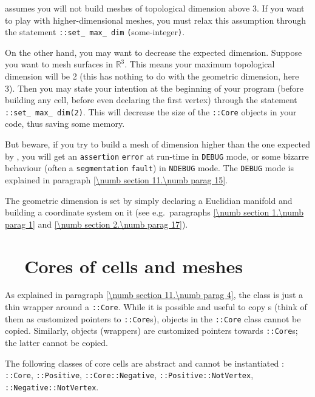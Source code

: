 \leavevmode {\ManiFEM} assumes you will not build meshes of topological dimension
above 3.
If you want to play with higher-dimensional meshes, you must relax this assumption
through the statement {\small\tt{}::set\_\,max\_\,dim}
{\small\tt (}some-integer{\small\tt )}.

On the other hand, you may want to decrease the expected dimension.
Suppose you want to mesh surfaces in $ \mathbb{R}^3 $.
This means your maximum topological dimension will be 2
(this has nothing to do with the geometric dimension, here 3).
Then you may state your intention at the beginning of your program
(before building any cell, before even declaring the first vertex) through
the statement {\small\tt{}::set\_\,max\_\,dim(2)}.
This will decrease the size of the {\small\tt{}::Core} objects in your code,
thus saving some memory.

But beware, if you try to build a mesh of dimension higher than the one expected by
\maniFEM, you will get an {\small\tt assertion} {\small\tt error} at run-time in
{\small\tt DEBUG} mode, or some bizarre behaviour (often a {\small\tt segmentation}
{\small\tt fault}) in {\small\tt NDEBUG} mode.
The {\small\tt DEBUG} mode is explained in paragraph \ref{\numb section 11.\numb parag 15}.

The geometric dimension is set by simply declaring a Euclidian manifold and building
a coordinate system on it (see e.g.\ paragraphs \ref{\numb section 1.\numb parag 1}
and \ref{\numb section 2.\numb parag 17}).


\section{~~Cores of cells and meshes}\label{\numb section 11.\numb parag 8}

As explained in paragraph \ref{\numb section 11.\numb parag 4}, the {\small\tt{}}
class is just a thin wrapper around a {\small\tt{}::Core}.
While it is possible and useful to copy {\small\tt{}}s (think of them as customized
pointers to {\small\tt{}::Core}s), objects in the {\small\tt{}::Core}
class cannot be copied.
Similarly, {\small\tt{}} objects (wrappers) are customized pointers towards
{\small\tt{}::Core}s; the latter cannot be copied.

The following classes of core cells are abstract and cannot be instantiated :
{\small\tt{}::Core}, {\small\tt{}::Positive},
{\small\tt{}::Core::Negative}, {\small\tt{}::Positive::NotVertex},
{\small\tt{}::Negative::NotVertex}.

